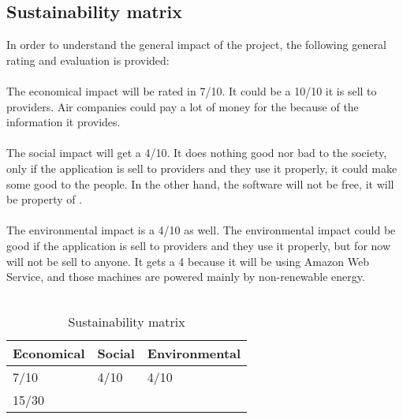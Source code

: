 \subsection{Sustainability matrix}

In order to understand the general impact of the project, the following general rating and evaluation is provided:
\\\\
The economical impact will be rated in 7/10. It could be a 10/10 it is sell to providers. Air companies could pay a lot of money for the \thesistitle because of the information it provides.
\\\\
The social impact will get a 4/10. It does nothing good nor bad to the society, only if the application is sell to providers and they use it properly, it could make some good to the people. In the other hand, the software will not be free, it will be property of \company.
\\\\
The environmental impact is a 4/10 as well. The environmental impact could be good if the application is sell to providers and they use it properly, but for now will not be sell to anyone. It gets a 4 because it will be using Amazon Web Service, and those machines are powered mainly by non-renewable energy\cite{click_clean}.
\\\\

\begin{table}[H]
\centering
\begin{tabular}{|l|l|l|}
\hline
Economical & Social & Environmental \\ \hline
7/10       & 4/10   & 4/10          \\ \hline
\multicolumn{3}{|l|}{15/30}         \\ \hline
\end{tabular}
\caption{Sustainability matrix}
\label{sustainability-matrix}
\end{table}

